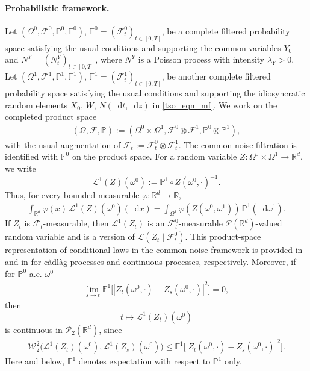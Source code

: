 \documentclass{article}
\newcommand*\der{\mathop{}\!\mathrm{d}}
\numberwithin{equation}{section}
\begin{document}
\paragraph{Probabilistic framework.}
 Let $ (\Omega^0,\mathcal{F}^0,\mathbb P^0,\mathbb{F}^0),\, \mathbb F^0=(\mathcal{F}_t^0)_{t\in[0,T]}$,
be a complete filtered probability space satisfying the usual conditions and supporting the common variables $
    Y_0$ and $N^Y=(N_t^Y)_{t\in[0,T]}$,
where $N^Y$ is a Poisson process with intensity $\lambda_Y>0$. Let $
    (\Omega^1,\mathcal F^1,\mathbb{P}^1,\mathbb F^1),\,
    \mathbb{F}^1=(\mathcal F_t^1)_{t\in[0,T]}$,
be another complete filtered probability space satisfying the usual conditions and supporting the idiosyncratic random elements $
    X_0,\, W,\, N(\der t,\der z)$ in \eqref{tso_eqn_mf}. We work on the completed product space
\begin{align}
    (\Omega,\mathcal F,\mathbb P)
    :=
    (\Omega^0\times\Omega^1,
    \mathcal{F}^0\otimes\mathcal F^1,
    \mathbb P^0\otimes\mathbb{P}^1),
\end{align}
with the usual augmentation of $\mathcal F_t:=\mathcal F_t^0\otimes\mathcal F_t^1$.
The common-noise filtration is identified with $\mathbb F^0$ on the product space. For a random variable
$Z:\Omega^0\times\Omega^1\to\mathbb R^d$, we write
\begin{equation}
    \mathcal L^1(Z)(\omega^0)
    :=
    \mathbb P^1\circ Z(\omega^0,\cdot)^{-1}.
\end{equation}
Thus, for every bounded measurable $\varphi:\mathbb R^d\to\mathbb R$,
\begin{align}
    \int_{\mathbb R^d}\varphi(x)\,\mathcal L^1(Z)(\omega^0)(\der x)
    =    \int_{\Omega^1}\varphi(Z(\omega^0,\omega^1))\,\mathbb P^1(\der \omega^1).
\end{align}
If $Z_t$ is $\mathcal F_t$-measurable, then $\mathcal L^1(Z_t)$ is an
$\mathcal F_t^0$-measurable $\mathcal P(\mathbb R^d)$-valued random variable and is a version of
$\mathcal L(Z_t\mid\mathcal F_t^0)$. This product-space representation of conditional laws in the common-noise framework  is provided in \cite[Appendix~A]{hernandez2025conditional} and in \cite{carmona2018probabilistic} for c\`{a}dl\`{a}g processes and continuous processes, respectively. Moreover, if for $\mathbb P^0$-a.e. $\omega^0$
\begin{align}
    \lim_{s\to t}\mathbb E^1
    \bigl[
        |Z_t(\omega^0,\cdot)-Z_s(\omega^0,\cdot)|^2
    \bigr]=0,
\end{align}
then
\begin{equation}
    t\mapsto \mathcal{L}^1(Z_t)(\omega^0)
\end{equation}
is continuous in $\mathcal P_2(\mathbb R^d)$, since
\begin{align}
    \mathcal W_2^2\bigl(\mathcal L^1(Z_t)(\omega^0),\mathcal L^1(Z_s)(\omega^0)\bigr)
    \le
    \mathbb E^1
    \bigl[
        |Z_t(\omega^0,\cdot)-Z_s(\omega^0,\cdot)|^2
    \bigr].
\end{align}
Here and below, $\mathbb E^1$ denotes expectation with respect to $\mathbb P^1$ only. 
\end{document}
